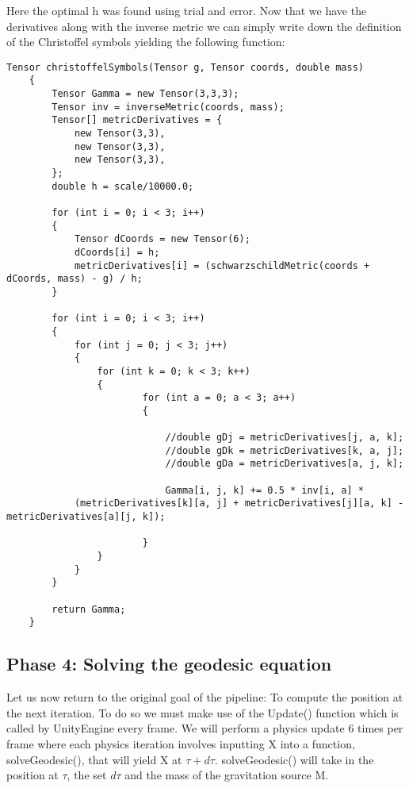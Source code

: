 \documentclass{article}
\begin{document}
Here the optimal h was found using trial and error. Now that we have the derivatives along with the inverse metric we can simply write down the definition of the Christoffel symbols yielding the following function:

\begin{verbatim}
Tensor christoffelSymbols(Tensor g, Tensor coords, double mass)
    {
        Tensor Gamma = new Tensor(3,3,3);
        Tensor inv = inverseMetric(coords, mass);
        Tensor[] metricDerivatives = {
            new Tensor(3,3),
            new Tensor(3,3),
            new Tensor(3,3),
        };
        double h = scale/10000.0;

        for (int i = 0; i < 3; i++)
        {
            Tensor dCoords = new Tensor(6);
            dCoords[i] = h;
            metricDerivatives[i] = (schwarzschildMetric(coords + dCoords, mass) - g) / h;
        }

        for (int i = 0; i < 3; i++)
        {
            for (int j = 0; j < 3; j++)
            {
                for (int k = 0; k < 3; k++)
                {
                        for (int a = 0; a < 3; a++)
                        {

                            //double gDj = metricDerivatives[j, a, k];
                            //double gDk = metricDerivatives[k, a, j];
                            //double gDa = metricDerivatives[a, j, k];

                            Gamma[i, j, k] += 0.5 * inv[i, a] * 
			(metricDerivatives[k][a, j] + metricDerivatives[j][a, k] - metricDerivatives[a][j, k]);

                        }
                }
            }
        }

        return Gamma;
    }
\end{verbatim}

\newpage

\subsection{Phase 4: Solving the geodesic equation}

Let us now return to the original goal of the pipeline: To compute the position at the next iteration. To do so we must make use of the Update() function which is called by UnityEngine every frame. We will perform a physics update 6 times per frame where each physics iteration involves inputting X into a function, solveGeodesic(), that will yield X at $\tau + d\tau$. solveGeodesic() will take in the position at $\tau$, the set $d\tau$ and the mass of the gravitation source M. 
\end{document}
